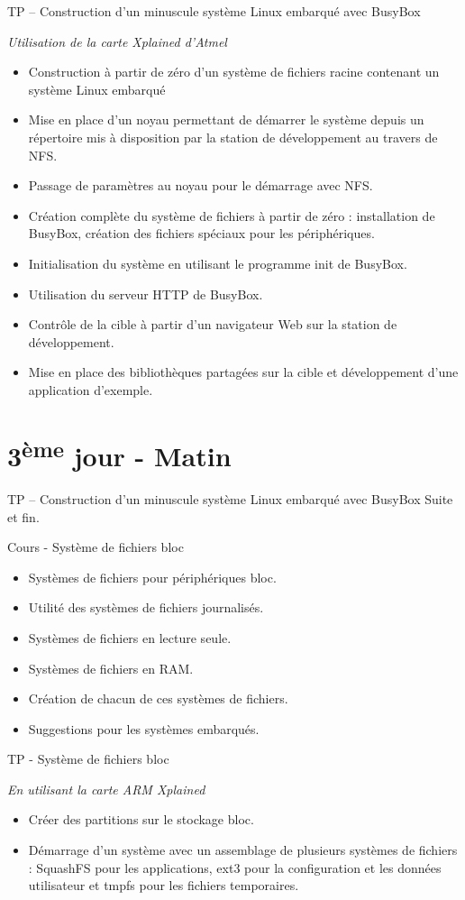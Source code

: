 \documentclass[a4paper,12pt,obeyspaces,spaces,hyphens]{article}
\begin{document}
\feagendaonecolumn
{TP – Construction d'un minuscule système Linux embarqué avec BusyBox}
{
  {\em Utilisation de la carte Xplained d'Atmel}
  \begin{itemize}
  \item Construction à partir de zéro d'un système de fichiers racine
	contenant un système Linux embarqué
  \item Mise en place d'un noyau permettant de démarrer le système
	depuis un répertoire mis à disposition par la station de
	développement au travers de NFS.
  \item Passage de paramètres au noyau pour le démarrage avec NFS.
  \item Création complète du système de fichiers à partir de zéro :
	installation de BusyBox, création des fichiers spéciaux
	pour les périphériques.
  \item Initialisation du système en utilisant le programme init de BusyBox.
  \item Utilisation du serveur HTTP de BusyBox.
  \item Contrôle de la cible à partir d'un navigateur Web sur la
	station de développement.
  \item Mise en place des bibliothèques partagées sur la cible et
	développement d'une application d'exemple.
  \end{itemize}
}

\section{3\textsuperscript{ème} jour - Matin}

\feagendaonecolumn
{TP – Construction d'un minuscule système Linux embarqué avec BusyBox}
{
   Suite et fin.
}

\feagendatwocolumn
{Cours - Système de fichiers bloc}
{
  \begin{itemize}
  \item Systèmes de fichiers pour périphériques bloc.
  \item Utilité des systèmes de fichiers journalisés.
  \item Systèmes de fichiers en lecture seule.
  \item Systèmes de fichiers en RAM.
  \item Création de chacun de ces systèmes de fichiers.
  \item Suggestions pour les systèmes embarqués.
  \end{itemize}
}
{TP - Système de fichiers bloc}
{
  {\em En utilisant la carte ARM Xplained}
  \begin{itemize}
  \item Créer des partitions sur le stockage bloc.
  \item Démarrage d'un système avec un assemblage de plusieurs systèmes
	de fichiers : SquashFS pour les applications, ext3 pour la
 	configuration et les données utilisateur et tmpfs pour les
	fichiers temporaires.
  \end{itemize}
}
\end{document}
